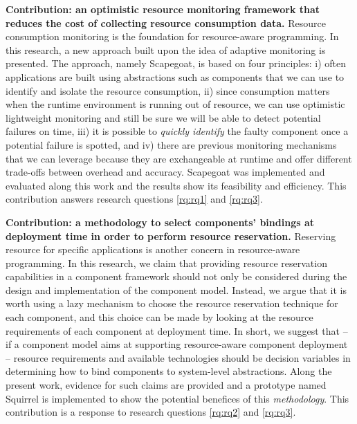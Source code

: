 \textbf{Contribution: an optimistic resource monitoring framework that reduces the cost of collecting resource consumption data.}
Resource consumption monitoring is the foundation for resource-aware programming.
In this research, a new approach built upon the idea of adaptive monitoring is presented.
The approach, namely Scapegoat, is based on four principles: i) often applications are built using abstractions such as components that we can use to identify and isolate the resource consumption, ii) since consumption matters when the runtime environment is running out
of resource, we can use optimistic lightweight monitoring and still be sure we will be able to detect potential failures on time, iii) it is possible to \textit{quickly identify} the faulty component once a potential failure is spotted, and iv) there are previous monitoring mechanisms that we can leverage because they are exchangeable at runtime and offer different trade-offs between overhead and accuracy.
Scapegoat was implemented and evaluated along this work and the results show its feasibility and efficiency.
This contribution answers research questions \ref{rq:rq1} and \ref{rq:rq3}.

\textbf{Contribution: a methodology to select components' bindings at deployment time in order to perform resource reservation.}
Reserving resource for specific applications is another concern in resource-aware programming.
In this research, we claim that providing resource reservation capabilities in a component framework should not only be considered during the design and implementation of the component model.
Instead, we argue that it is worth using a lazy mechanism to choose the resource reservation technique for each component, and this choice can be made by looking at the resource requirements of each component at deployment time.
In short, we suggest that -- if a component model aims at supporting resource-aware component deployment -- resource requirements and available technologies should be decision variables in determining how to bind components to system-level abstractions.
Along the present work, evidence for such claims are provided and a prototype named Squirrel is implemented to show the potential benefices of this \textit{methodology}.
This contribution is a response to research questions \ref{rq:rq2} and \ref{rq:rq3}.

